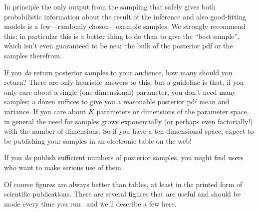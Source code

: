 \documentclass[modern]{aastex61}
\newcommand{\MCMC}{\acronym{MCMC}}
\begin{document}
In principle the only output from the sampling that safely gives both
probabilistic information about the result of the inference and also
good-fitting models is a few---randomly chosen---example samples.
We strongly recommend this; in
particular this is a better thing to do than to give the ``best
sample'', which isn't even guaranteed to be near the bulk of the
posterior pdf or the samples therefrom.

If you \emph{do} return posterior samples to your audience, how many
should you return?
There are only heuristic answers to this, but a guideline is that, if
you only care about a single (one-dimensional) parameter, you don't
need many samples; a dozen suffices to give you a reasonable posterior
pdf mean and variance.
If you care about $K$ parameters or dimensions of the parameter space,
in general the need for samples grows exponentially (or perhaps even
factorially!) with the number of dimensions.
So if you have a ten-dimensional space, expect to be publishing your
samples in an electronic table on the web!

If you \emph{do} publish sufficient numbers of posterior samples, you
might find users who want to make serious use of them.

Of course figures are always better than tables, at least in the
printed form of scientific publications.
There are several figures that are useful and should be made every time you
run \MCMC\ and we'll describe a few here.
\end{document}
